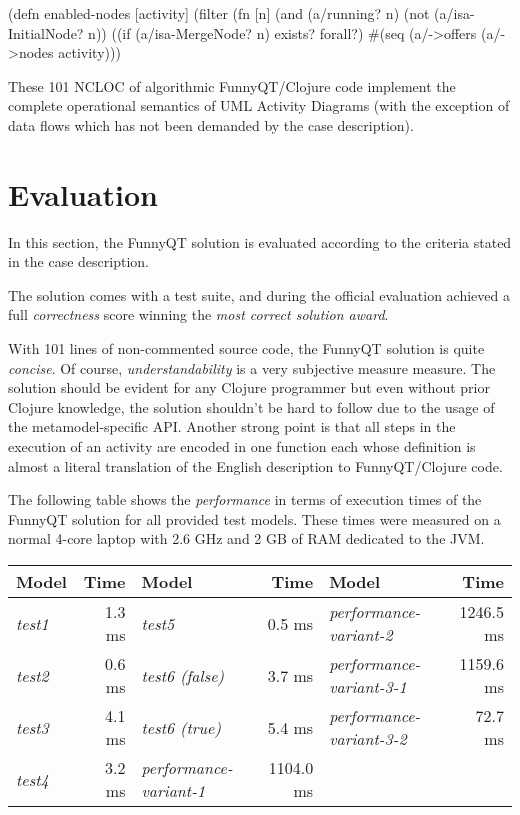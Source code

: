 \documentclass[submission]{eptcs}
\begin{document}
\begin{clojurecode}
(defn enabled-nodes [activity]
  (filter (fn [n]
            (and (a/running? n)
                 (not (a/isa-InitialNode? n))
                 ((if (a/isa-MergeNode? n) exists? forall?)
                  #(seq (a/->offers %
          (a/->nodes activity)))
\end{clojurecode}

These 101 NCLOC of algorithmic FunnyQT/Clojure code implement the complete
operational semantics of UML Activity Diagrams (with the exception of data
flows which has not been demanded by the case description).

\section{Evaluation}
\label{sec:evaluation}

In this section, the FunnyQT solution is evaluated according to the criteria
stated in the case description.

The solution comes with a test suite, and during the official evaluation
achieved a full \emph{correctness} score winning the \emph{most correct
  solution award}.

With 101 lines of non-commented source code, the FunnyQT solution is quite
\emph{concise}.  Of course, \emph{understandability} is a very subjective
measure measure.  The solution should be evident for any Clojure programmer but
even without prior Clojure knowledge, the solution shouldn't be hard to follow
due to the usage of the metamodel-specific API.  Another strong point is that
all steps in the execution of an activity are encoded in one function each
whose definition is almost a literal translation of the English description to
FunnyQT/Clojure code.

The following table shows the \emph{performance} in terms of execution times of
the FunnyQT solution for all provided test models.  These times were measured
on a normal 4-core laptop with 2.6 GHz and 2 GB of RAM dedicated to the JVM.

\vspace{3pt}
\begin{tabular}{|l r | l r | l r |}
  \hline
  \textbf{Model} & \textbf{Time} & \textbf{Model} & \textbf{Time} & \textbf{Model} & \textbf{Time}\\
  \hline
  \emph{test1} & 1.3 ms & \emph{test5} & 0.5 ms & \emph{performance-variant-2} & 1246.5 ms\\
  \emph{test2} & 0.6 ms & \emph{test6 (false)} & 3.7 ms & \emph{performance-variant-3-1} & 1159.6 ms\\
  \emph{test3} & 4.1 ms & \emph{test6 (true)}  & 5.4 ms & \emph{performance-variant-3-2} & 72.7 ms\\
  \emph{test4} & 3.2 ms & \emph{performance-variant-1} & 1104.0 ms & &\\
  \hline
\end{tabular}
\vspace{3pt}
\end{document}
